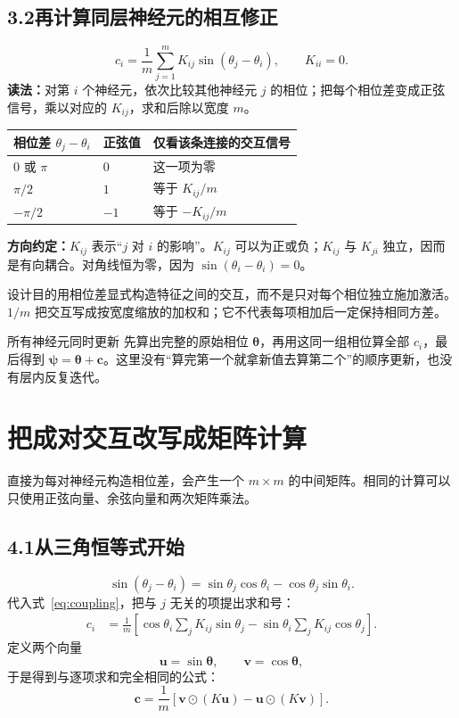 \documentclass[UTF8,11pt,a4paper,fontset=fandol]{ctexart}
\newcommand{\purpose}[1]{\begin{explain}{设计目的}#1\end{explain}}
\newcommand{\newsection}[1]{\clearpage\section{#1}}
\begin{document}
\subsection*{3.2\quad 再计算同层神经元的相互修正}
\begin{equation}\label{eq:coupling}
\boxed{c_i=\frac{1}{m}\sum_{j=1}^{m}K_{ij}\sin(\theta_j-\theta_i)},\qquad K_{ii}=0.
\end{equation}
\textbf{读法：}对第 $i$ 个神经元，依次比较其他神经元 $j$ 的相位；把每个相位差变成正弦信号，乘以对应的 $K_{ij}$，求和后除以宽度 $m$。
\par\smallskip\noindent\begin{tabularx}{\linewidth}{@{}p{27mm}p{24mm}Y@{}}
\toprule
相位差 $\theta_j-\theta_i$&正弦值&仅看该条连接的交互信号\\\midrule
$0$ 或 $\pi$&$0$&这一项为零\\
$\pi/2$&$1$&等于 $K_{ij}/m$\\
$-\pi/2$&$-1$&等于 $-K_{ij}/m$\\\bottomrule
\end{tabularx}\par\smallskip
\textbf{方向约定：}$K_{ij}$ 表示“$j$ 对 $i$ 的影响”。$K_{ij}$ 可以为正或负；$K_{ij}$ 与 $K_{ji}$ 独立，因而是有向耦合。对角线恒为零，因为 $\sin(\theta_i-\theta_i)=0$。
\purpose{用相位差显式构造特征之间的交互，而不是只对每个相位独立施加激活。$1/m$ 把交互写成按宽度缩放的加权和；它不代表每项相加后一定保持相同方差。}
\begin{notebox}{所有神经元同时更新}
先算出完整的原始相位 $\boldsymbol{\theta}$，再用这同一组相位算全部 $c_i$，最后得到 $\boldsymbol{\psi}=\boldsymbol{\theta}+\boldsymbol{c}$。这里没有“算完第一个就拿新值去算第二个”的顺序更新，也没有层内反复迭代。
\end{notebox}

\newsection{把成对交互改写成矩阵计算}
直接为每对神经元构造相位差，会产生一个 $m\times m$ 的中间矩阵。相同的计算可以只使用正弦向量、余弦向量和两次矩阵乘法。
\subsection*{4.1\quad 从三角恒等式开始}
\[
\sin(\theta_j-\theta_i)
=\sin\theta_j\cos\theta_i-\cos\theta_j\sin\theta_i.
\]
代入式~\eqref{eq:coupling}，把与 $j$ 无关的项提出求和号：
\begin{align}
c_i&=\frac{1}{m}\left[\cos\theta_i\sum_jK_{ij}\sin\theta_j
-\sin\theta_i\sum_jK_{ij}\cos\theta_j\right].
\end{align}
定义两个向量
\[
\boldsymbol{u}=\sin\boldsymbol{\theta},\qquad
\boldsymbol{v}=\cos\boldsymbol{\theta},
\]
于是得到与逐项求和完全相同的公式：
\begin{equation}\label{eq:vectorcoupling}
\boxed{\boldsymbol{c}=\frac{1}{m}\left[
\boldsymbol{v}\odot(K\boldsymbol{u})
-\boldsymbol{u}\odot(K\boldsymbol{v})\right].}
\end{equation}
\end{document}
